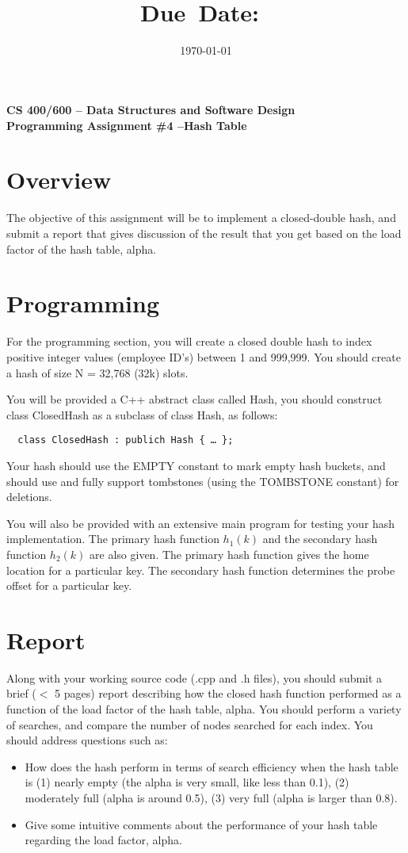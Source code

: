 \documentclass{article}
\title{\textmd{\textbf{\hmwkClass\\\
      \hmwkTitle}}\\\normalsize\small{Due\ Date:\
    \hmwkDueDate}\\}
\date{\today}
\author{\textsc{\hmwkAuthorName}}
\begin{document}
\begin{center}
\textbf{{\Large CS 400/600 – Data Structures and Software Design} \\
{\large Programming Assignment \#4 –Hash Table}}
\end{center}

\section*{Overview}
The objective of this assignment will be to implement a closed-double
hash, and submit a report that gives  discussion of the result that
you get based on the load factor of the hash table, alpha.  

\section*{Programming}
For the programming section, you will create a closed double hash to
index positive integer values (employee ID’s) between 1 and 999,999.
You should create a hash of size N = 32,768 (32k) slots. 

You will be provided a C++ abstract class called Hash, you should
construct class ClosedHash as a subclass of class Hash, as follows:
\begin{verbatim}
  class ClosedHash : publich Hash { … }; 
\end{verbatim}
Your hash should use the EMPTY constant to mark empty hash buckets,
and should use and fully support tombstones (using the TOMBSTONE
constant) for deletions. 

You will also be provided with an extensive main program for testing
your hash implementation. The primary hash function $h_1(k)$ and the
secondary hash function $h_2(k)$ are also given. The primary hash
function gives the home location for a particular key. The secondary
hash function determines the probe offset for a particular key. 

\section*{Report}
Along with your working source code (.cpp and .h files), you should
submit a brief ($<$ 5 pages) report describing how the closed hash
function performed as a function of the load factor of the hash table,
alpha. You should perform a variety of searches, and compare the
number of nodes searched for each index.  You should address questions
such as: 
\begin{itemize}
\item How does the hash perform in terms of search efficiency when the hash
  table is (1) nearly empty (the alpha is very small, like less than
  0.1),  (2) moderately full (alpha is around 0.5),  (3) very full
  (alpha is larger than 0.8). 
\item Give some intuitive comments about the performance of your hash table
  regarding the load factor, alpha.  
\end{itemize}
\end{document}
